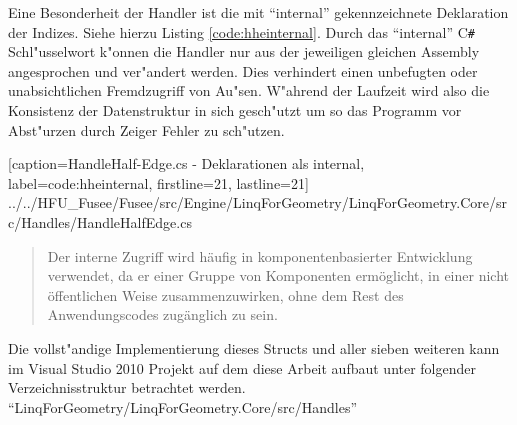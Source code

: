 \documentclass[pagesize, paper=a4, fontsize=12pt,titlepage=true, headings=small, headnosepline, abstractoff, liststotoc, nochapterprefix, plainheadsepline]{scrreprt}
\newcommand{\CSS}{C\texttt{\# }}
\begin{document}
Eine Besonderheit der Handler ist die mit "`internal"' gekennzeichnete Deklaration der Indizes. Siehe hierzu Listing \ref{code:hheinternal}. Durch das "`internal"' \CSS Schl"usselwort k"onnen die Handler nur aus der jeweiligen gleichen Assembly angesprochen und ver"andert werden. Dies verhindert einen unbefugten oder unabsichtlichen Fremdzugriff von Au"sen. W"ahrend der Laufzeit wird also die Konsistenz der Datenstruktur in sich gesch"utzt um so das Programm vor Abst"urzen durch Zeiger Fehler zu sch"utzen.

			[caption={HandleHalf-Edge.cs - Deklarationen als internal}, label=code:hheinternal, firstline=21, lastline=21]
			{../../HFU_Fusee/Fusee/src/Engine/LinqForGeometry/LinqForGeometry.Core/src/Handles/HandleHalfEdge.cs}

\begin{quote}{\dq}Der interne Zugriff wird h{\"a}ufig in komponentenbasierter Entwicklung verwendet, da er einer Gruppe von Komponenten erm{\"o}glicht, in einer nicht {\"o}ffentlichen Weise zusammenzuwirken, ohne dem Rest des Anwendungscodes zug{\"a}nglich zu sein.{\dq} \cite{MicrosoftCReferenz.2013}\end{quote}


Die vollst"andige Implementierung dieses Structs und aller sieben weiteren kann im Visual Studio 2010 Projekt auf dem diese Arbeit aufbaut unter folgender Verzeichnisstruktur betrachtet werden. "`LinqForGeometry/LinqForGeometry.Core/src/Handles"'
\end{document}
